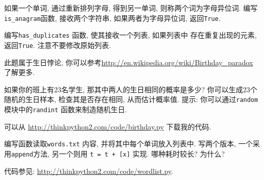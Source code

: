 \documentclass[10pt]{book}
\begin{document}
\begin{exercise}
\label{anagram}

如果一个单词, 通过重新排列字母, 得到另一单词, 则称两个词为字母异位词. 
编写\verb"is_anagram"函数, 接收两个字符串, 如果两者为字母异位词, 返回{\tt True}.
\end{exercise}



\begin{exercise}
\label{duplicate}

编写\verb"has_duplicates" 函数, 使其接收一个列表, 如果列表中
存在重复出现的元素, 返回{\tt True}. 注意不要修改原始列表.

\end{exercise}


\begin{exercise}

此题属于生日悖论, 你可以参考\url{http://en.wikipedia.org/wiki/Birthday_paradox}
了解更多.

如果你的班上有23名学生, 那其中两人的生日相同的概率是多少? 
你可以生成23个随机的生日样本, 检查其是否存在相同, 从而估计概率值. 
提示: 你可以通过{\tt random}模块中的{\tt randint} 函数来制造随机生日. 

可以从 \url{http://thinkpython2.com/code/birthday.py} 下载我的代码.

\end{exercise}


\begin{exercise}

编写函数读取{\tt words.txt} 内容, 并将其中每个单词放入列表中. 
写两个版本, 一个采用{\tt append}方法, 另一个则用 {\tt t = t + [x]} 实现. 
哪种耗时较长? 为什么?

代码参见: \url{http://thinkpython2.com/code/wordlist.py}.

\end{exercise}
\end{document}
